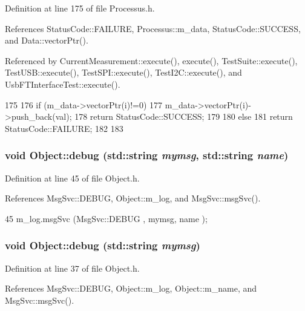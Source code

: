 Definition at line 175 of file Processus.h.

References StatusCode::FAILURE, Processus::m\_\-data, StatusCode::SUCCESS, and Data::vectorPtr().

Referenced by CurrentMeasurement::execute(), execute(), TestSuite::execute(), TestUSB::execute(), TestSPI::execute(), TestI2C::execute(), and UsbFTInterfaceTest::execute().


\begin{DoxyCode}
175                                         {
176     if (m_data->vectorPtr(i)!=0){
177       m_data->vectorPtr(i)->push_back(val);
178       return StatusCode::SUCCESS;
179     }
180     else {
181       return StatusCode::FAILURE;
182     }
183   }
\end{DoxyCode}
\hypertarget{classObject_a6c9a0397ca804e04d675ed05683f5420}{
\subsubsection[{debug}]{\setlength{\rightskip}{0pt plus 5cm}void Object::debug (std::string {\em mymsg}, \/  std::string {\em name})}}
\label{classObject_a6c9a0397ca804e04d675ed05683f5420}


Definition at line 45 of file Object.h.

References MsgSvc::DEBUG, Object::m\_\-log, and MsgSvc::msgSvc().


\begin{DoxyCode}
45 { m_log.msgSvc (MsgSvc::DEBUG   , mymsg, name ); }
\end{DoxyCode}
\hypertarget{classObject_aac010553f022165573714b7014a15f0d}{
\subsubsection[{debug}]{\setlength{\rightskip}{0pt plus 5cm}void Object::debug (std::string {\em mymsg})}}
\label{classObject_aac010553f022165573714b7014a15f0d}


Definition at line 37 of file Object.h.

References MsgSvc::DEBUG, Object::m\_\-log, Object::m\_\-name, and MsgSvc::msgSvc().

